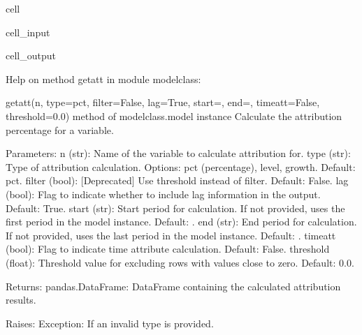 \documentclass[letterpaper,10pt,english]{jupyterBook}
\begin{document}
\begin{sphinxuseclass}{cell}\begin{sphinxVerbatimInput}

\begin{sphinxuseclass}{cell_input}
\begin{sphinxVerbatim}[commandchars=\\\{\}]
\end{sphinxVerbatim}

\end{sphinxuseclass}\end{sphinxVerbatimInput}
\begin{sphinxVerbatimOutput}

\begin{sphinxuseclass}{cell_output}
\begin{sphinxVerbatim}[commandchars=\\\{\}]
Help on method get\PYGZus{}att in module modelclass:

get\PYGZus{}att(n, type=\PYGZsq{}pct\PYGZsq{}, filter=False, lag=True, start=\PYGZsq{}\PYGZsq{}, end=\PYGZsq{}\PYGZsq{}, time\PYGZus{}att=False, threshold=0.0) method of modelclass.model instance
    Calculate the attribution percentage for a variable.
    
    Parameters:
        n (str): Name of the variable to calculate attribution for.
        type (str): Type of attribution calculation. Options: \PYGZsq{}pct\PYGZsq{} (percentage), \PYGZsq{}level\PYGZsq{}, \PYGZsq{}growth\PYGZsq{}. Default: \PYGZsq{}pct\PYGZsq{}.
        filter (bool): [Deprecated] Use threshold instead of filter. Default: False.
        lag (bool): Flag to indicate whether to include lag information in the output. Default: True.
        start (str): Start period for calculation. If not provided, uses the first period in the model instance. Default: \PYGZsq{}\PYGZsq{}.
        end (str): End period for calculation. If not provided, uses the last period in the model instance. Default: \PYGZsq{}\PYGZsq{}.
        time\PYGZus{}att (bool): Flag to indicate time attribute calculation. Default: False.
        threshold (float): Threshold value for excluding rows with values close to zero. Default: 0.0.
    
    Returns:
        pandas.DataFrame: DataFrame containing the calculated attribution results.
    
    Raises:
        Exception: If an invalid type is provided.
\end{sphinxVerbatim}

\end{sphinxuseclass}\end{sphinxVerbatimOutput}

\end{sphinxuseclass}
\end{document}
